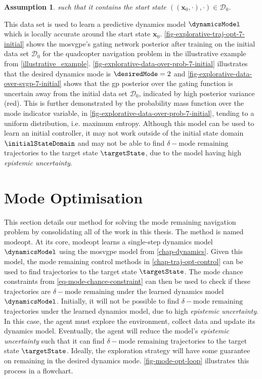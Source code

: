 \documentclass{mimosis-class/mimosis}
\newtheorem{assumption}{Assumption}[section]
\numberwithin{equation}{chapter}
\newcommand{\state}{\ensuremath{\mathbf{x}}}
\newcommand{\dataset}{\ensuremath{\mathcal{D}}}
\begin{document}
{\begin{assumption}
such that it contains the start state $((\state_0, \cdot), \cdot) \in \dataset_0$.
\end{assumption}
This data set is used to learn a predictive dynamics model \(\dynamicsModel\)
which is locally accurate around the start state \(\state_0\).
\cref{fig-explorative-traj-opt-7-initial} shows the \acrshort{mosvgpe}'s gating network posterior after training on the
initial data set \(\dataset_0\) for the quadcopter navigation problem in the illustrative example from
\cref{illustrative_example}.
\cref{fig-explorative-data-over-prob-7-initial} illustrates that the desired dynamics mode is \(\desiredMode=2\)
and \cref{fig-explorative-data-over-svgp-7-initial} shows that the \acrshort{gp} posterior over the gating function
is uncertain away from the initial data set \(\dataset_0\), indicated by high posterior variance (red).
This is further demonstrated by the probability mass function over the mode indicator variable,
in \cref{fig-explorative-data-over-prob-7-initial},
tending to a uniform distribution, i.e. maximum entropy.
Although this model can be used to learn an
initial controller, it may not work outside of the initial state domain \(\initialStateDomain\) and may
not be able to find \(\delta-\text{mode remaining}\) trajectories to the target state \(\targetState\), due to
the model having high \emph{epistemic uncertainty}.

\section{Mode Optimisation \label{sec-mode-optimisation}}
\label{sec:org28426f7}
This section details our method for solving the mode remaining navigation problem by consolidating all of
the work in this thesis. The method is named \acrfull{modeopt}.
At its core, \acrshort{modeopt} learns a single-step dynamics model \(\dynamicsModel\) using the \acrshort{mosvgpe}
model from \cref{chap-dynamics}.
Given this model, the mode remaining control methods in \cref{chap-traj-opt-control}
can be used to find trajectories to the target state \(\targetState\).
The mode chance constraints from \cref{eq-mode-chance-constraint}
can then be used to check if these trajectories are \(\delta-\text{mode remaining}\) under the learned dynamics
model \(\dynamicsModel\).
Initially, it will not be possible to find
\(\delta-\text{mode remaining}\) trajectories under the learned dynamics model, due to high
\emph{epistemic uncertainty}.
In this case, the agent must explore the environment, collect  data and update its dynamics model.
Eventually, the agent will reduce the model's \emph{epistemic uncertainty} such that
it can find \(\delta-\text{mode remaining}\) trajectories to the target state \(\targetState\).
Ideally, the exploration strategy will have some guarantee on remaining in the desired dynamics mode.
\cref{fig-mode-opt-loop} illustrates this process in a flowchart.

}
\end{document}
